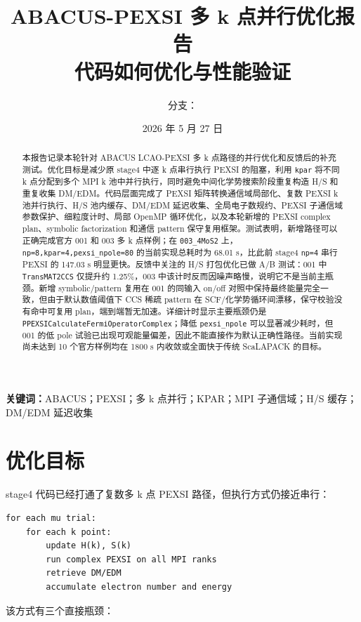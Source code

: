 \documentclass[a4paper,11pt]{article}
\title{\textbf{ABACUS-PEXSI 多 k 点并行优化报告}\\
\large 代码如何优化与性能验证}
\author{分支：\code{pexsi-stage4-pattern-reuse-opt}}
\date{2026 年 5 月 27 日}
\newcommand{\code}[1]{\texttt{#1}}
\begin{document}
\maketitle

\begin{abstract}
本报告记录本轮针对 ABACUS LCAO-PEXSI 多 k 点路径的并行优化和反馈后的补充测试。优化目标是减少原 stage4 中逐 k 点串行执行 PEXSI 的阻塞，利用 \code{kpar} 将不同 k 点分配到多个 MPI k 池中并行执行，同时避免中间化学势搜索阶段重复构造 H/S 和重复收集 DM/EDM。代码层面完成了 PEXSI 矩阵转换通信域局部化、复数 PEXSI k 池并行执行、H/S 池内缓存、DM/EDM 延迟收集、全局电子数规约、PEXSI 子通信域参数保护、细粒度计时、局部 OpenMP 循环优化，以及本轮新增的 PEXSI complex plan、symbolic factorization 和通信 pattern 保守复用框架。测试表明，新增路径可以正确完成官方 001 和 003 多 k 点样例；在 \code{003\_4MoS2} 上，\code{np=8,kpar=4,pexsi\_npole=80} 的当前实现总耗时为 68.01 s，比此前 stage4 \code{np=4} 串行 PEXSI 的 147.03 s 明显更快。反馈中关注的 H/S 打包优化已做 A/B 测试：001 中 \code{TransMAT2CCS} 仅提升约 1.25\%，003 中该计时反而因噪声略慢，说明它不是当前主瓶颈。新增 symbolic/pattern 复用在 001 的同输入 on/off 对照中保持最终能量完全一致，但由于默认数值阈值下 CCS 稀疏 pattern 在 SCF/化学势循环间漂移，保守校验没有命中可复用 plan，端到端暂无加速。详细计时显示主要瓶颈仍是 \code{PPEXSICalculateFermiOperatorComplex}；降低 \code{pexsi\_npole} 可以显著减少耗时，但 001 的低 pole 试验已出现可观能量偏差，因此不能直接作为默认正确性路径。当前实现尚未达到 10 个官方样例均在 1800 s 内收敛或全面快于传统 ScaLAPACK 的目标。
\end{abstract}

\noindent\textbf{关键词：}ABACUS；PEXSI；多 k 点并行；KPAR；MPI 子通信域；H/S 缓存；DM/EDM 延迟收集

\tableofcontents
\newpage

\section{优化目标}

stage4 代码已经打通了复数多 k 点 PEXSI 路径，但执行方式仍接近串行：

\begin{verbatim}
for each mu trial:
    for each k point:
        update H(k), S(k)
        run complex PEXSI on all MPI ranks
        retrieve DM/EDM
        accumulate electron number and energy
\end{verbatim}

该方式有三个直接瓶颈：
\end{document}
